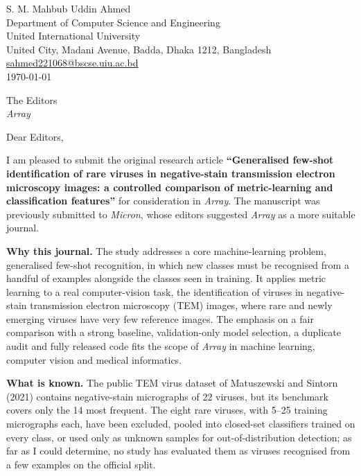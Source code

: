 \documentclass[11pt]{article}
\begin{document}
\pagestyle{empty}
\small

\begin{flushright}
S. M. Mahbub Uddin Ahmed\\
Department of Computer Science and Engineering\\
United International University\\
United City, Madani Avenue, Badda, Dhaka 1212, Bangladesh\\
\href{mailto:sahmed221068@bscse.uiu.ac.bd}{sahmed221068@bscse.uiu.ac.bd}\\[6pt]
\today
\end{flushright}

The Editors\\
\textit{Array}

Dear Editors,

I am pleased to submit the original research article \textbf{``Generalised few-shot identification of rare viruses in negative-stain transmission electron microscopy images: a controlled comparison of metric-learning and classification features''} for consideration in \textit{Array}. The manuscript was previously submitted to \textit{Micron}, whose editors suggested \textit{Array} as a more suitable journal.

\textbf{Why this journal.} The study addresses a core machine-learning problem, generalised few-shot recognition, in which new classes must be recognised from a handful of examples alongside the classes seen in training. It applies metric learning to a real computer-vision task, the identification of viruses in negative-stain transmission electron microscopy (TEM) images, where rare and newly emerging viruses have very few reference images. The emphasis on a fair comparison with a strong baseline, validation-only model selection, a duplicate audit and fully released code fits the scope of \textit{Array} in machine learning, computer vision and medical informatics.

\textbf{What is known.} The public TEM virus dataset of Matuszewski and Sintorn (2021) contains negative-stain micrographs of 22 viruses, but its benchmark covers only the 14 most frequent. The eight rare viruses, with 5--25 training micrographs each, have been excluded, pooled into closed-set classifiers trained on every class, or used only as unknown samples for out-of-distribution detection; as far as I could determine, no study has evaluated them as viruses recognised from a few examples on the official split.
\end{document}
